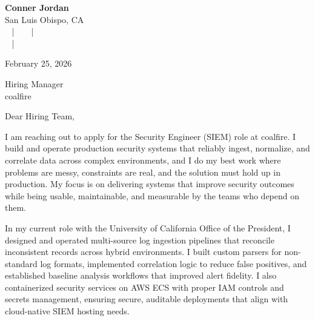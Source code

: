 \documentclass[letterpaper,11pt]{article}
\newcommand{\companyname}{coalfire}
\begin{document}
\begin{center}
  {\Huge \textbf{Conner Jordan}}\\[4pt]
  {\Large San Luis Obispo, CA}\\[4pt]
  \href{tel:+18059759793}{
    } ~ | ~
  \href{mailto:connercharlesjordan@gmail.com}{
    } ~ | ~
   \\
  \href{https://www.linkedin.com/in/conner-jordan-4b268514a/}{
    } ~ | ~
  \href{https://github.com/cjordan223}{
    }
\end{center}

\vspace{16pt}

\begin{flushright}
February 25, 2026
\end{flushright}

Hiring Manager\\
\companyname

\vspace{26pt}

\noindent
Dear Hiring Team,

\vspace{16pt}

I am reaching out to apply for the Security Engineer (SIEM) role at coalfire. I build and operate production security systems that reliably ingest, normalize, and correlate data across complex environments, and I do my best work where problems are messy, constraints are real, and the solution must hold up in production. My focus is on delivering systems that improve security outcomes while being usable, maintainable, and measurable by the teams who depend on them.

\vspace{16pt}

In my current role with the University of California Office of the President, I designed and operated multi-source log ingestion pipelines that reconcile inconsistent records across hybrid environments. I built custom parsers for non-standard log formats, implemented correlation logic to reduce false positives, and established baseline analysis workflows that improved alert fidelity. I also containerized security services on AWS ECS with proper IAM controls and secrets management, ensuring secure, auditable deployments that align with cloud-native SIEM hosting needs.
\end{document}
